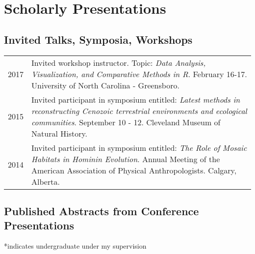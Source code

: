 \documentclass{article}
\newenvironment{mylist}
{\begin{description}[style=unboxed,leftmargin=1.3cm]}
{\end{description}}
\begin{document}
\section*{Scholarly Presentations}
\subsection*{Invited Talks, Symposia, Workshops}

\begin{tabular}{p{}p{}}
2017 & Invited workshop instructor. Topic: \emph{Data Analysis, Visualization, and Comparative Methods in R}. February 16-17. University of North Carolina - Greensboro.\\[4pt]

2015 & Invited participant in symposium entitled: \emph{Latest methods in reconstructing Cenozoic terrestrial environments and ecological communities}. September 10 - 12. Cleveland Museum of Natural History.\\[4pt]
2014 & Invited participant in symposium entitled: \emph{The Role of Mosaic Habitats in Hominin Evolution}. Annual Meeting of the American Association of Physical Anthropologists. Calgary, Alberta.\\
\end{tabular}
\subsection*{Published Abstracts from Conference Presentations}

\begin{mylist}
\item[] *indicates undergraduate under my supervision
\end{mylist}
\end{document}
